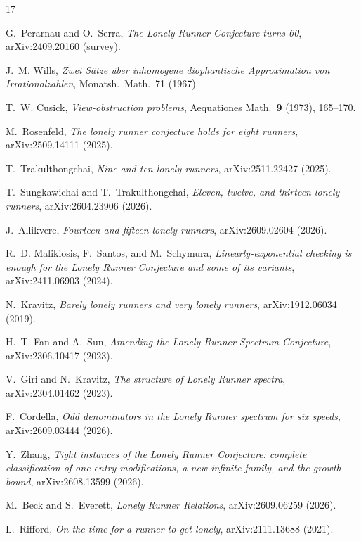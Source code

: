 \documentclass[11pt,a4paper]{article}
\numberwithin{equation}{section}
\theoremstyle{plain}
\theoremstyle{definition}
\theoremstyle{remark}
\begin{document}
\begingroup\sloppy\raggedright
\begin{thebibliography}{17}

G.~Perarnau and O.~Serra,
\emph{The Lonely Runner Conjecture turns 60},
arXiv:2409.20160 (survey).

J.~M. Wills,
\emph{Zwei S\"atze \"uber inhomogene diophantische Approximation von
Irrationalzahlen},
Monatsh.\ Math.\ 71 (1967).

T.~W. Cusick,
\emph{View-obstruction problems},
Aequationes Math.\ \textbf{9} (1973), 165--170.

M.~Rosenfeld,
\emph{The lonely runner conjecture holds for eight runners},
arXiv:2509.14111 (2025).

T.~Trakulthongchai,
\emph{Nine and ten lonely runners},
arXiv:2511.22427 (2025).

T.~Sungkawichai and T.~Trakulthongchai,
\emph{Eleven, twelve, and thirteen lonely runners},
arXiv:2604.23906 (2026).

J.~Allikvere,
\emph{Fourteen and fifteen lonely runners},
arXiv:2609.02604 (2026).

R.~D. Malikiosis, F.~Santos, and M.~Schymura,
\emph{Linearly-exponential checking is enough for the Lonely Runner
Conjecture and some of its variants},
arXiv:2411.06903 (2024).

N.~Kravitz,
\emph{Barely lonely runners and very lonely runners},
arXiv:1912.06034 (2019).

H.~T. Fan and A.~Sun,
\emph{Amending the Lonely Runner Spectrum Conjecture},
arXiv:2306.10417 (2023).

V.~Giri and N.~Kravitz,
\emph{The structure of Lonely Runner spectra},
arXiv:2304.01462 (2023).

F.~Cordella,
\emph{Odd denominators in the Lonely Runner spectrum for six speeds},
arXiv:2609.03444 (2026).

Y.~Zhang,
\emph{Tight instances of the Lonely Runner Conjecture: complete
classification of one-entry modifications, a new infinite family, and the
growth bound},
arXiv:2608.13599 (2026).

M.~Beck and S.~Everett,
\emph{Lonely Runner Relations},
arXiv:2609.06259 (2026).

L.~Rifford,
\emph{On the time for a runner to get lonely},
arXiv:2111.13688 (2021).


\end{thebibliography}
\end{document}
